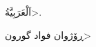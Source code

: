 \documentclass[a4paper,12pt]{article}
\begin{document}
\<اَلْعَرَبِيَّةُ>. 

\<ڕۆژوان فواد گورون>\\
\end{document}
